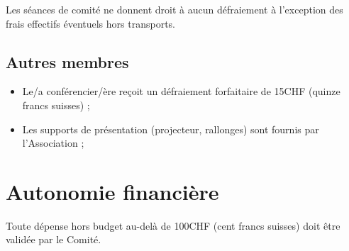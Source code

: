 \documentclass[12pt,twoside]{report}
\begin{document}
Les séances de comité ne donnent droit à aucun défraiement à l’exception des frais effectifs éventuels hors transports.

\section*{Autres membres}
\begin{itemize}
\item Le/a conférencier/ère reçoit un défraiement forfaitaire de 15CHF (quinze francs suisses) ;
\item Les supports de présentation (projecteur, rallonges) sont fournis par l’Association ;
\end{itemize}

\chapter*{Autonomie financière}
Toute dépense hors budget au-delà de 100CHF (cent francs suisses) doit être validée par le Comité.
\end{document}
